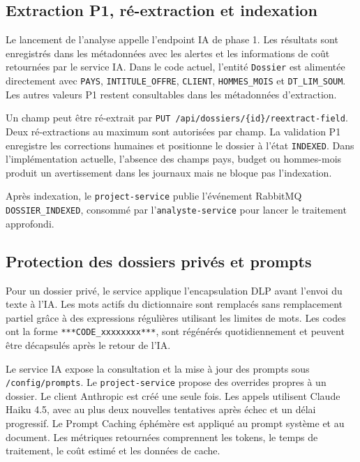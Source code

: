 \subsection{Extraction P1, ré-extraction et indexation}

Le lancement de l’analyse appelle l’endpoint IA de phase 1. Les résultats sont enregistrés dans les métadonnées avec les alertes et les informations de coût retournées par le service IA. Dans le code actuel, l’entité \texttt{Dossier} est alimentée directement avec \texttt{PAYS}, \texttt{INTITULE\_OFFRE}, \texttt{CLIENT}, \texttt{HOMMES\_MOIS} et \texttt{DT\_LIM\_SOUM}. Les autres valeurs P1 restent consultables dans les métadonnées d’extraction.

Un champ peut être ré-extrait par \texttt{PUT /api/dossiers/\{id\}/reextract-field}. Deux ré-extractions au maximum sont autorisées par champ. La validation P1 enregistre les corrections humaines et positionne le dossier à l’état \texttt{INDEXED}. Dans l’implémentation actuelle, l’absence des champs pays, budget ou hommes-mois produit un avertissement dans les journaux mais ne bloque pas l’indexation.

Après indexation, le \texttt{project-service} publie l’événement RabbitMQ \texttt{DOSSIER\_INDEXED}, consommé par l’\texttt{analyste-service} pour lancer le traitement approfondi.

\subsection{Protection des dossiers privés et prompts}

Pour un dossier privé, le service applique l’encapsulation DLP avant l’envoi du texte à l’IA. Les mots actifs du dictionnaire sont remplacés sans remplacement partiel grâce à des expressions régulières utilisant les limites de mots. Les codes ont la forme \texttt{***CODE\_xxxxxxxx***}, sont régénérés quotidiennement et peuvent être décapsulés après le retour de l’IA.

Le service IA expose la consultation et la mise à jour des prompts sous \texttt{/config/prompts}. Le \texttt{project-service} propose des overrides propres à un dossier. Le client Anthropic est créé une seule fois. Les appels utilisent Claude Haiku 4.5, avec au plus deux nouvelles tentatives après échec et un délai progressif. Le Prompt Caching éphémère est appliqué au prompt système et au document. Les métriques retournées comprennent les tokens, le temps de traitement, le coût estimé et les données de cache.

